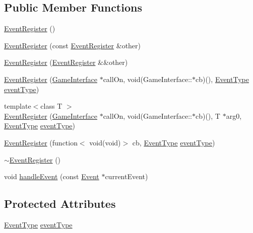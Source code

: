 \subsection*{Public Member Functions}
\begin{DoxyCompactItemize}
\item 
\hyperlink{class_event_register_a41739c6653b17ec40d294591be47e709}{Event\-Register} ()
\item 
\hyperlink{class_event_register_ae5f23b5853832189a422f8bf0f1539ed}{Event\-Register} (const \hyperlink{class_event_register}{Event\-Register} \&other)
\item 
\hyperlink{class_event_register_a4ae5b21f5051b7a8165d3429e33f46b4}{Event\-Register} (\hyperlink{class_event_register}{Event\-Register} \&\&other)
\item 
\hyperlink{class_event_register_a49194d607881335a3a8eb69ecdb636b0}{Event\-Register} (\hyperlink{class_game_interface}{Game\-Interface} $\ast$call\-On, void(Game\-Interface\-::$\ast$cb)(), \hyperlink{_input_8hpp_ae5e40304c43dac2b9c0f1a7e2505e0e7}{Event\-Type} \hyperlink{class_event_register_a0b6153036279b1189d7349d4f97632a9}{event\-Type})
\item 
{\footnotesize template$<$class T $>$ }\\\hyperlink{class_event_register_ae306d8fffaa2290aeee74ec444053ba5}{Event\-Register} (\hyperlink{class_game_interface}{Game\-Interface} $\ast$call\-On, void(Game\-Interface\-::$\ast$cb)(), T $\ast$arg0, \hyperlink{_input_8hpp_ae5e40304c43dac2b9c0f1a7e2505e0e7}{Event\-Type} \hyperlink{class_event_register_a0b6153036279b1189d7349d4f97632a9}{event\-Type})
\item 
\hyperlink{class_event_register_a920b1e5a22a82fee463632f2ebd940bd}{Event\-Register} (function$<$ void(void)$>$ cb, \hyperlink{_input_8hpp_ae5e40304c43dac2b9c0f1a7e2505e0e7}{Event\-Type} \hyperlink{class_event_register_a0b6153036279b1189d7349d4f97632a9}{event\-Type})
\item 
\hyperlink{class_event_register_a2acf491bc76d59b6ae684e6cb5c78519}{$\sim$\-Event\-Register} ()
\item 
void \hyperlink{class_event_register_a452eea8df05259c4c337960f8907003f}{handle\-Event} (const \hyperlink{_input_8hpp_a968dbade547d18c0fc972caf39d984e8}{Event} $\ast$current\-Event)
\end{DoxyCompactItemize}
\subsection*{Protected Attributes}
\begin{DoxyCompactItemize}
\item 
\hyperlink{_input_8hpp_ae5e40304c43dac2b9c0f1a7e2505e0e7}{Event\-Type} \hyperlink{class_event_register_a0b6153036279b1189d7349d4f97632a9}{event\-Type}
\end{DoxyCompactItemize}

